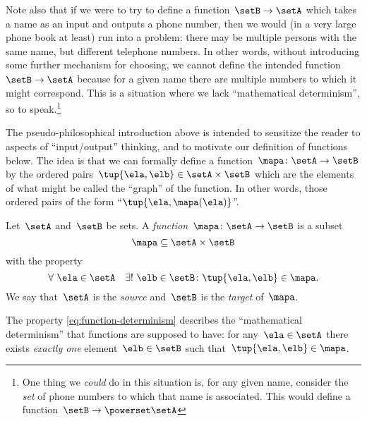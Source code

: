 Note also that if we were to try to define a function~$\setB \to \setA$ which takes a name as an input and outputs a phone number, then we would (in a very large phone book at least) run into a problem: there may be multiple persons with the same name, but different telephone numbers.
In other words, without introducing some further mechanism for choosing, we cannot define the intended function~$\setB \to \setA$ because for a given name there are multiple numbers to which it might correspond.
This is a situation where we lack ``mathematical determinism'', so to speak.\footnote{One thing we \emph{could} do in this situation is, for any given name, consider the \emph{set} of phone numbers to which that name is associated.
This would define a function~$\setB \to \powerset \setA$}

The pseudo-philosophical introduction above is intended to sensitize the reader to aspects of ``input/output'' thinking, and to motivate our definition of functions below.
The idea is that we can formally define a function~$\mapa\colon \setA \to \setB$ by the ordered pairs~$\tup{\ela, \elb} \in \setA \times \setB$ which are the elements of what might be called the ``graph'' of the function.
In other words, those ordered pairs of the form ``$\tup{\ela, \mapa(\ela)}$''.

\begin{definition}
    \label{def:function}
    Let~$\setA$ and~$\setB$ be sets.
A \emph{function}~$\mapa\colon \setA \to \setB$ is a subset
    \begin{equation*}
        \mapa \subseteq \setA \times \setB
    \end{equation*}
    with the property
    \begin{equation}
        \label{eq:function-determinism}
        \forall \ \ela \in \setA  \quad  \exists ! \ \elb \in \setB \colon \tup{\ela,\elb} \in \mapa.
    \end{equation}
    We say that~$\setA$ is the \emph{source} and~$\setB$ is the \emph{target} of~$\mapa$.
\end{definition}



The property \cref{eq:function-determinism} describes the ``mathematical determinism'' that functions are supposed to have:
for any~$\ela \in \setA$ there exists \emph{exactly one} element~$\elb \in \setB$ such that~$\tup{\ela, \elb} \in \mapa$.

